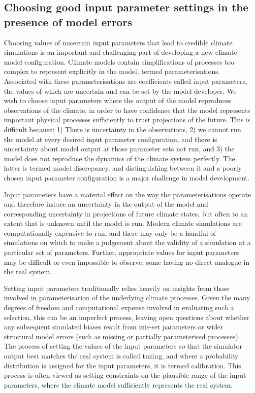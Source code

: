 \documentclass[gmd, manuscript]{copernicus}
\begin{document}


\introduction  %
\subsection{Choosing good input parameter settings in the presence of model errors}

Choosing values of uncertain input parameters that lead to credible climate simulations is an important and challenging part of developing a new climate model configuration. Climate models contain simplifications of processes too complex to represent explicitly in the model, termed parameterisations. Associated with these parameterisations are coefficients called input parameters, the values of which are uncertain and can be set by the model developer. We wish to choose input parameters where the output of the model reproduces observations of the climate, in order to have confidence that the model represents important physical processes sufficiently to trust projections of the future. This is difficult because: 1) There is uncertainty in the observations, 2) we cannot run the model at every desired input parameter configuration, and there is uncertainty about model output at those parameter sets not run, and 3) the model does not reproduce the dynamics of the climate system perfectly. The latter is termed model discrepancy, and distinguishing between it and a poorly chosen input parameter configuration is a major challenge in model development. 

Input parameters have a material effect on the way the parameterisations operate and therefore induce an uncertainty in the output of the model and corresponding uncertainty in projections of future climate states, but often to an extent that is unknown until the model is run. Modern climate simulations are computationally expensive to run, and there may only be a handful of simulations on which to make a judgement about the validity of a simulation at a particular set of parameters. Further, appropriate values for input parameters may be difficult or even impossible to observe, some having no direct analogue in the real system.

Setting input parameters traditionally relies heavily on insights from those involved in parameterisation of the underlying climate processes. Given the many degrees of freedom and computational expense involved in evaluating such a selection, this can be an imperfect process, leaving open questions about whether any subsequent simulated biases result from mis-set parameters or wider structural model errors (such as missing or partially parameterised processes). The process of setting the values of the input parameters so that the simulator output best matches the real system is called tuning, and where a probability distribution is assigned for the input parameters, it is termed calibration. This process is often viewed as setting constraints on the plausible range of the input parameters, where the climate model sufficiently represents the real system.
\end{document}
